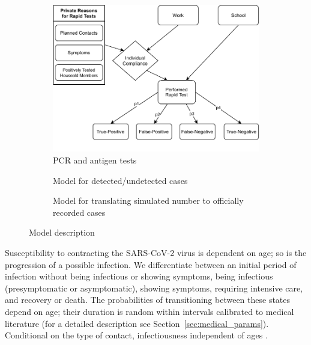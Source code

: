 \begin{figure}[!tp]
\begin{subfigure}[b]{0.425\textwidth}
        \includegraphics[width=\textwidth]{../figures/model-graph-bottom-left}
        \caption{{\small PCR and antigen tests}}
        \label{fig:pcr_antigen_tests}
    \end{subfigure}
    \hfill
    \begin{subfigure}[b]{0.425\textwidth}
        \centering

        Model for detected/undetected cases

        \caption{{\small Model for translating simulated number to officially recorded cases}}
        \label{fig:model_for_official_cases}
    \end{subfigure}

    \caption{Model description}
    \label{fig:model-description}


\end{figure}

Susceptibility to contracting the SARS-CoV-2 virus is dependent on age; so is the
progression of a possible infection. We differentiate between an initial period of
infection without being infectious or showing symptoms, being infectious (presymptomatic
or asymptomatic), showing symptoms, requiring intensive care, and recovery or death. The
probabilities of transitioning between these states depend on age; their duration is
random within intervals calibrated to medical literature (for a detailed description see
Section~\ref{sec:medical_params}).
Conditional on the type of contact, infectiousness independent of ages \citep{Jones2021}.

